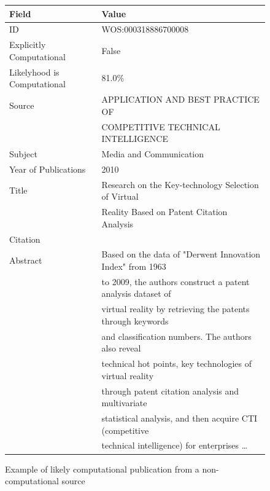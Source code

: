\documentclass[12pt, a4paper]{article}
\begin{document}
\begin{figure}[ht]
	\begin{tabular}{ll}
		\toprule
		Field & Value\\
		\midrule
		ID & WOS:000318886700008 \\
		Explicitly Computational & False \\
		Likelyhood is Computational & 81.0\% \\
		Source &  APPLICATION AND BEST PRACTICE OF\\
		&COMPETITIVE TECHNICAL INTELLIGENCE \\
		Subject & Media and Communication\\
		Year of Publications & 2010 \\
		Title &  Research on the Key-technology Selection of Virtual\\
		&Reality Based on Patent Citation Analysis \\
		Citation & \cite{JianmeiWang}\\
		\midrule
		Abstract &  Based on the data of "Derwent Innovation Index" from 1963\\
		&to 2009, the authors construct a patent analysis dataset of\\
		&virtual reality by retrieving the patents through keywords\\
		&and classification numbers. The authors also reveal\\
		&technical hot points, key technologies of virtual reality\\
		&through patent citation analysis and multivariate\\
		&statistical analysis, and then acquire CTI (competitive\\
		&technical intelligence) for enterprises \dots \\
		\bottomrule
	\end{tabular}
\caption{Example of likely computational publication from a non-computational source}\label{sample_comp}
\end{figure}
\end{document}

